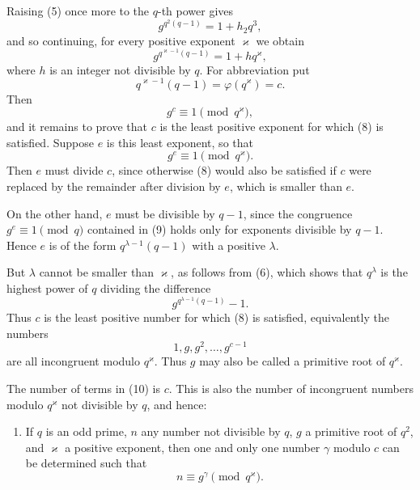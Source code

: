 \documentclass[11pt]{article}
\begin{document}
Raising (5) once more to the $q$-th power gives
\[
g^{q^2(q-1)}=1+h_2q^3,
\]
and so continuing, for every positive exponent $\varkappa$ we obtain
\begin{equation}
g^{q^{\varkappa-1}(q-1)}=1+hq^\varkappa,
\tag{6}
\end{equation}
where $h$ is an integer not divisible by $q$. For abbreviation put
\begin{equation}
q^{\varkappa-1}(q-1)=\varphi(q^\varkappa)=c.
\tag{7}
\end{equation}
Then
\begin{equation}
g^c\equiv1\pmod{q^\varkappa},
\tag{8}
\end{equation}
and it remains to prove that $c$ is the least positive exponent for which (8) is satisfied. Suppose $e$ is this least exponent, so that
\begin{equation}
g^e\equiv1\pmod{q^\varkappa}.
\tag{9}
\end{equation}
Then $e$ must divide $c$, since otherwise (8) would also be satisfied if $c$ were replaced by the remainder after division by $e$, which is smaller than $e$.

On the other hand, $e$ must be divisible by $q-1$, since the congruence $g^e\equiv1\pmod q$ contained in (9) holds only for exponents divisible by $q-1$. Hence $e$ is of the form $q^{\lambda-1}(q-1)$ with a positive $\lambda$.

But $\lambda$ cannot be smaller than $\varkappa$, as follows from (6), which shows that $q^\lambda$ is the highest power of $q$ dividing the difference
\[
g^{q^{\lambda-1}(q-1)}-1.
\]
Thus $c$ is the least positive number for which (8) is satisfied, equivalently the numbers
\begin{equation}
1,g,g^2,
\ldots,g^{c-1}
\tag{10}
\end{equation}
are all incongruent modulo $q^\varkappa$. Thus $g$ may also be called a primitive root of $q^\varkappa$.

The number of terms in (10) is $c$. This is also the number of incongruent numbers modulo $q^\varkappa$ not divisible by $q$, and hence:

\begin{enumerate}[resume,label=\arabic*.]
\item If $q$ is an odd prime, $n$ any number not divisible by $q$, $g$ a primitive root of $q^2$, and $\varkappa$ a positive exponent, then one and only one number $\gamma$ modulo $c$ can be determined such that
\[
n\equiv g^\gamma\pmod{q^\varkappa}.
\]
\end{enumerate}
\end{document}
